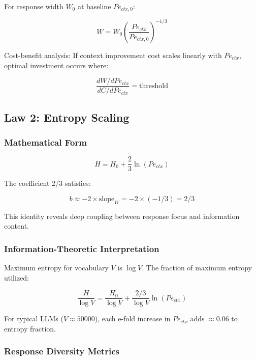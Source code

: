 \documentclass[conference]{IEEEtran}
\begin{document}
For response width $W_0$ at baseline $Pe_{ctx,0}$:

\begin{equation}
W = W_0 \left(\frac{Pe_{ctx}}{Pe_{ctx,0}}\right)^{-1/3}
\end{equation}

Cost-benefit analysis: If context improvement cost scales linearly with $Pe_{ctx}$, optimal investment occurs where:

\begin{equation}
\frac{dW/dPe_{ctx}}{dC/dPe_{ctx}} = \text{threshold}
\end{equation}

\subsection{Law 2: Entropy Scaling}

\subsubsection{Mathematical Form}

\begin{equation}
H = H_0 + \frac{2}{3}\ln(Pe_{ctx})
\end{equation}

The coefficient 2/3 satisfies:

\begin{equation}
b \approx -2 \times \text{slope}_W = -2 \times (-1/3) = 2/3
\end{equation}

This identity reveals deep coupling between response focus and information content.

\subsubsection{Information-Theoretic Interpretation}

Maximum entropy for vocabulary $V$ is $\log V$. The fraction of maximum entropy utilized:

\begin{equation}
\frac{H}{\log V} = \frac{H_0}{\log V} + \frac{2/3}{\log V}\ln(Pe_{ctx})
\end{equation}

For typical LLMs ($V \approx 50000$), each e-fold increase in $Pe_{ctx}$ adds $\approx 0.06$ to entropy fraction.

\subsubsection{Response Diversity Metrics}
\end{document}
